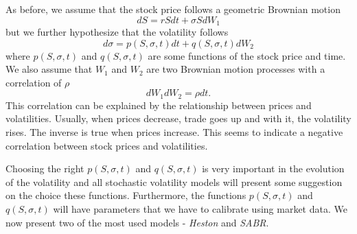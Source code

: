 As before, we assume that the stock price follows a geometric Brownian motion
\begin{equation}
dS=rSdt+\sigma SdW_1
\end{equation}
\noindent but we further hypothesize that the volatility follows
\begin{equation}
d\sigma=p(S,\sigma,t)dt+q(S,\sigma,t)dW_2
\end{equation}
\noindent where $p(S,\sigma,t)$ and $q(S,\sigma,t)$ are some functions of the stock price and time. We also assume that $W_1$ and $W_2$ are two Brownian motion processes with a correlation of $\rho$
\begin{equation}
dW_1dW_2=\rho dt.
\end{equation}
\noindent This correlation can be explained by the relationship between prices and volatilities. Usually, when prices decrease, trade goes up and with it, the volatility rises. The inverse is true when prices increase. This seems to indicate a negative correlation between stock prices and volatilities.

\iffalse
\hl{This correlation can be explained by the relationship between prices and volatilities.} As an example, we can consider a stock that costs \textdollar100 and changes by \textdollar0.10 daily. We can estimate, even without calculations, that it is very stable and thus has a low volatility.
On the other hand if another stock costs \textdollar1 and changes by \textdollar0.10 in a day, we can see that it is extremely volatile even though it changed by the same amount as the first. With this example, we can see that the volatility has some correlation with the stock price.
\fi

Choosing the right $p(S,\sigma,t)$ and $q(S,\sigma,t)$ is very important in the evolution of the volatility and all stochastic volatility models will present some suggestion on the choice these functions. Furthermore, the functions $p(S,\sigma,t)$ and $q(S,\sigma,t)$ will have parameters that we have to calibrate using market data. We now present two of the most used models - \emph{Heston} and \emph{SABR}.



